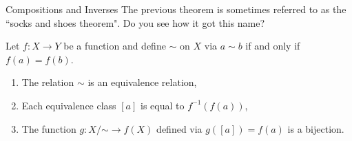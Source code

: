 \begin{section}{Compositions and Inverses}
The previous theorem is sometimes referred to as the ``socks and shoes theorem".  Do you see how it got this name?

\begin{theorem}
Let $f:X\to Y$ be a function and define $\sim$ on $X$ via $a\sim b$ if and only if $f(a) = f(b)$.
\begin{enumerate}[label=\textrm{(\alph*)}]
\item The relation $\sim$ is an equivalence relation,
\item Each equivalence class $[a]$ is equal to $f^{-1}(f(a))$,
\item The function $g:X/\mathord\sim\to f(X)$ defined via $g([a]) = f(a)$ is a bijection.
\end{enumerate}
\end{theorem}

\end{section}
